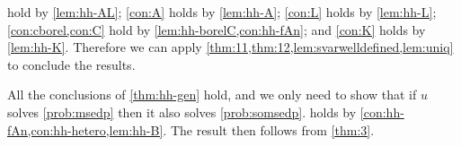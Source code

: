  hold by \cref{lem:hh-AL};
\cref{con:A} holds by \cref{lem:hh-A};
\cref{con:L} holds by \cref{lem:hh-L};
 \cref{con:cborel,con:C} hold by \cref{lem:hh-borelC,con:hh-fAn};
and \cref{con:K} holds by \cref{lem:hh-K}. Therefore we can apply \cref{thm:11,thm:12,lem:svarwelldefined,lem:uniq} to conclude the results.
\epf

All the conclusions of \cref{thm:hh-gen} hold, and we only need to show that if $u$ solves \cref{prob:msedp} then it also solves \cref{prob:somsedp}.  holds by \cref{con:hh-fAn,con:hh-hetero,lem:hh-B}. The result then follows from \cref{thm:3}.
\epf
